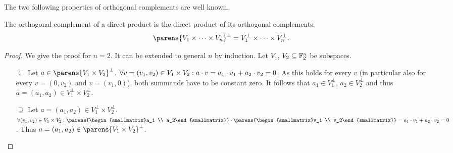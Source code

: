 The two following properties of orthogonal complements are well known.
\begin{lemma}
    The orthogonal complement of a direct product is the direct product of its orthogonal complements:
    \begin{equation*}
        \parens{V_1 \times \cdots \times V_n}^\perp = V_1^\perp \times \cdots \times V_n^\perp.
    \end{equation*}
\end{lemma}
\begin{proof}
    We give the proof for $n = 2$.
    It can be extended to general $n$ by induction.
    Let $V_1$, $V_2 \subseteq \mathbb{F}_2^n$ be subspaces.
    \begin{itemize}
        \item[$\subseteq$]
            Let $a \in \parens{V_1 \times V_2}^\perp$.
            $\forall v = (v_1, v_2) \in V_1 \times V_2 : a \cdot v = a_1 \cdot v_1 + a_2 \cdot v_2 = 0$.
            As this holds for every $v$ (in particular also for every $v = (0, v_2)$ and $v = (v_1, 0)$), both summands have to be constant zero.
            It follows that $a_1 \in V_1^\perp$, $a_2 \in V_2^\perp$ and thus $a = (a_1, a_2) \in V_1^\perp \times V_2^\perp$.
        \item[$\supseteq$]
            Let $a = (a_1, a_2) \in V_1^\perp \times V_2^\perp$.
            $\forall (v_1, v_2) \in V_1 \times V_2 : \iprod{\parens{\begin{smallmatrix}a_1 \\ a_2\end{smallmatrix}}}{\parens{\begin{smallmatrix}v_1 \\ v_2\end{smallmatrix}}} = \iprod{a_1}{v_1} + \iprod{a_2}{v_2} = 0$.
            Thus $a = (a_1, a_2) \in \parens{V_1 \times V_2}^\perp$.
    \end{itemize}
\end{proof}

